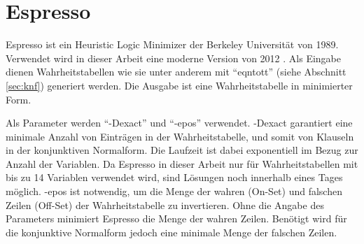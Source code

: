 \section{Espresso}
\label{sec:espresso}

Espresso ist ein Heuristic Logic Minimizer der Berkeley Universität von 1989. Verwendet wird in dieser
Arbeit eine moderne Version von 2012 \cite{espressobin}. Als Eingabe dienen Wahrheitstabellen wie sie
unter anderem mit "`eqntott"' (siehe Abschnitt \ref{sec:knf}) generiert werden. Die Ausgabe ist eine
Wahrheitstabelle in minimierter Form.

Als Parameter werden "`-Dexact"' und "`-epos"' verwendet. -Dexact garantiert eine minimale Anzahl von
Einträgen in der Wahrheitstabelle, und somit von Klauseln in der konjunktiven Normalform. Die Laufzeit
ist dabei exponentiell im Bezug zur Anzahl der Variablen. Da Espresso in dieser Arbeit nur für
Wahrheitstabellen mit bis zu 14 Variablen verwendet wird, sind Lösungen noch innerhalb eines Tages möglich.
-epos ist notwendig, um die Menge der wahren (On-Set) und falschen Zeilen (Off-Set) der Wahrheitstabelle
zu invertieren. Ohne die Angabe des Parameters minimiert Espresso die Menge der wahren Zeilen. Benötigt
wird für die konjunktive Normalform jedoch eine minimale Menge der falschen Zeilen.